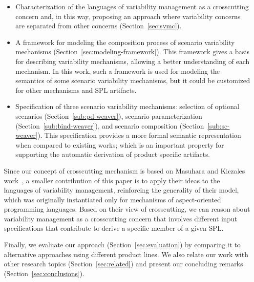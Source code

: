 \documentclass{acm_proc_article-sp}
\begin{document}
\begin{itemize}
\item Characterization of the languages of variability management as a crosscutting concern and, in this way, proposing an approach where variability concerns are separated from other concerns (Section~\ref{sec:svmc}).


\item A framework for modeling the composition process of scenario variability
mechanisms (Section~\ref{sec:modeling-framework}). This framework gives a basis for describing variability mechanisms,
allowing a better understanding of each mechanism. In this work, such a framework
is used for modeling the semantics of some scenario variability mechanisms, but
it could be customized for other mechanisms and SPL artifacts.

\item Specification of three scenario variability mechanisms: selection of
optional scenarios (Section~\ref{sub:pd-weaver}), scenario parameterization (Section~\ref{sub:bind-weaver}), and scenario composition (Section~\ref{sub:sc-weaver}). This specification provides a more formal semantic
representation when compared to existing works; which is an important property for
supporting the automatic derivation of product specific artifacts.
\end{itemize}

Since our concept of crosscutting mechanism is based on Masuhara and Kiczales
work~\cite{Masuhara:2003aa}, a smaller contribution of this paper is to apply
their ideas to the languages of variability management,  reinforcing the
generality of their model, which was originally instantiated only for mechanisms
of aspect-oriented programming languages. Based on their view of crosscutting, we
can reason about variability management as a crosscutting concern that involves
different input specifications that contribute to derive a specific member of a
given SPL.

Finally, we evaluate our approach (Section~\ref{sec:evaluation}) by comparing it
to alternative approaches using different product lines. We also relate our work
with other research topics (Section~\ref{sec:related}) and present our concluding
remarks (Section~\ref{sec:conclusions}). 
\end{document}
